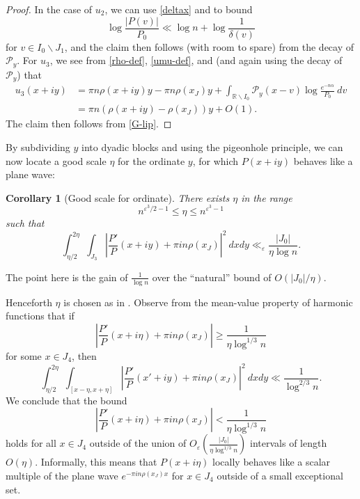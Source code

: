 \documentclass[12pt]{amsart}
\newtheorem{corollary}[theorem]{Corollary}
\newcommand{\eps}{\varepsilon}
\newcommand{\R}{\mathbb{R}}
\newcommand{\Poisson}{\mathcal{P}}
\begin{document}
\begin{proof}
In the case of $u_2$, we can use \eqref{deltax} and  to bound
$$\log \frac{|P(v)|}{P_0} \ll \log n + \log \frac{1}{\delta(v)}$$
for $v \in I_0 \backslash J_1$, and the claim then follows (with room to spare) from the decay of $\Poisson_y$.  For $u_3$, we see from \eqref{rho-def}, \eqref{umu-def}, and  (and again using the decay of $\Poisson_y$) that
\begin{align*}
 u_3(x+iy) &= \pi n \rho(x+iy) y - \pi n \rho(x_J) y + \int_{\R \backslash I_0} \Poisson_y(x-v) \log \frac{e^{-n\alpha}}{P_0}\ dv\\
&= \pi n (\rho(x+iy) - \rho(x_J)) y + O(1).
\end{align*}
The claim then follows from \eqref{G-lip}.
\end{proof}

By subdividing $y$ into dyadic blocks and using the pigeonhole principle, we can now locate a good scale $\eta$ for the ordinate $y$, for which $P(x+iy)$ behaves like a plane wave:

\begin{corollary}[Good scale for ordinate]\label{dyadic}  There exists $\eta$ in the range
\begin{equation}\label{eta-range}
    n^{\eps^3/2-1} \leq \eta \leq n^{\eps^3-1}
\end{equation}
such that
$$ \int_{\eta/2}^{2\eta} \int_{J_3} \left|\frac{P'}{P}(x+iy) + \pi in\rho(x_J)\right|^2\ dx dy \ll_\eps \frac{|J_0|}{\eta \log n}.$$
\end{corollary}

The point here is the gain of $\frac{1}{\log n}$ over the ``natural'' bound of $O(|J_0|/\eta)$.

Henceforth $\eta$ is chosen as in .
Observe from the mean-value property of harmonic functions that if
$$ \left|\frac{P'}{P}(x+i\eta) + \pi in\rho(x_J)\right| \geq \frac{1}{\eta \log^{1/3} n}$$
for some $x \in J_4$, then
$$ \int_{\eta/2}^{2\eta} \int_{[x-\eta,x+\eta]} \left|\frac{P'}{P}(x'+iy) + \pi in\rho(x_J)\right|^2\ dx dy \ll \frac{1}{\log^{2/3} n}.$$
We conclude that the bound
\begin{equation}\label{ej}
    \left|\frac{P'}{P}(x+i\eta) + \pi in\rho(x_J)\right| < \frac{1}{\eta \log^{1/3} n}
\end{equation}
holds for all $x \in J_4$ outside of the union of $O_\eps( \frac{|J_0|}{\eta \log^{1/3} n} )$ intervals of length $O(\eta)$.  Informally, this means that $P(x+i\eta)$ locally behaves like a scalar multiple of the plane wave $e^{-\pi i n\rho(x_J) x}$ for $x \in J_4$ outside of a small exceptional set.
\end{document}
